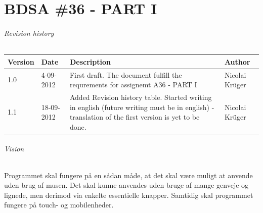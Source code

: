\documentclass{article}
\begin{document}
  
  \part*{BDSA \#36 - PART I}
  
  \paragraph{Revision history} \mbox{}  
  
  \begin{table}[ht]
    \begin{tabular}{|p{35pt}|p{50pt}|p{150pt}|p{75pt}|}
        \hline
        Version & Date &
        Description & 
        Author         
        \\ \hline
        1.0 & 4-09-2012 & 
        First draft. The document fulfill the requrements for assignemt A36 - PART I &
        Nicolai Krüger 
        \\ \hline        
        1.1 & 18-09-2012 & 
        Added Revision history table. Started writing in english (future writing must be in english) - translation of the first version is yet to be done. & 
        Nicolai Krüger              
        \\ \hline
    \end{tabular}
\end{table}
  
  \paragraph{Vision} \mbox{} 
  
  Programmet skal fungere på en sådan måde, at det skal være muligt at anvende uden brug af musen. Det skal kunne anvendes uden bruge af mange genveje og lignede, men derimod via enkelte essentielle knapper. 
Samtidig skal programmet fungere på touch- og mobilenheder.
  
\end{document}
